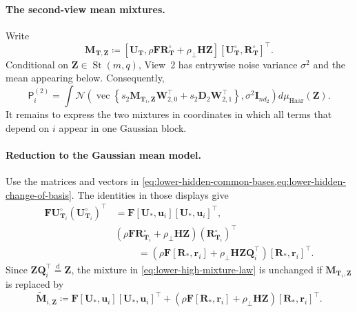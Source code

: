 \documentclass[11pt]{article}
\newcommand{\trans}{\top}
\begin{document}
\paragraph{The second-view mean mixtures.}
Write
\[
  \bm M_{\bm T,\bm Z}
  \coloneqq
  \left[
    \bm U_{\bm T},
    \rho\bm F\bm R_{\bm T}^{\circ}
      +\rho_\perp\bm H\bm Z
  \right]
  [\bm U_{\bm T}^{\circ},\bm R_{\bm T}^{\circ}]^\trans.
\]
Conditional on $\bm Z\in\operatorname{St}(m,q)$, View~2 has entrywise noise
variance $\sigma^2$ and the mean appearing below.  Consequently,
\begin{equation}
  \mathsf P_i^{(2)}
  =
  \int
  \mathcal N\left(
    \operatorname{vec}\left\{
      s_2\bm M_{\bm T_i,\bm Z}\bm W_{2,0}^\trans
      +
      s_2\bm D_2\bm W_{2,1}^\trans
    \right\},
    \sigma^2\bm I_{nd_2}
  \right)
  d\mu_{\mathrm{Haar}}(\bm Z).
\label{eq:lower-high-mixture-law}
\end{equation}
It remains to express the two mixtures in coordinates in which all terms
that depend on $i$ appear in one Gaussian block.

\paragraph{Reduction to the Gaussian mean model.}
Use the matrices and vectors in
\cref{eq:lower-hidden-common-bases,eq:lower-hidden-change-of-basis}.  The
identities in those displays give
\begin{equation}
\begin{aligned}
  \bm F\bm U_{\bm T_i}^{\circ}
  (\bm U_{\bm T_i}^{\circ})^\trans
  &=
  \bm F[\bm U_*,\bm u_i][\bm U_*,\bm u_i]^\trans,\\
  &(\rho\bm F\bm R_{\bm T_i}^{\circ}+\rho_\perp\bm H\bm Z)
  (\bm R_{\bm T_i}^{\circ})^\trans\\
  &\hspace{1cm}=
  (\rho\bm F[\bm R_*,\bm r_i]
    +\rho_\perp\bm H\bm Z\bm Q_i^\trans)
  [\bm R_*,\bm r_i]^\trans.
\end{aligned}
\label{eq:lower-high-basis-change}
\end{equation}
Since $\bm Z\bm Q_i^\trans\overset{\mathrm d}{=}\bm Z$, the mixture in
\cref{eq:lower-high-mixture-law} is unchanged if
$\bm M_{\bm T_i,\bm Z}$ is replaced by
\begin{equation}
  \widetilde{\bm M}_{i,\bm Z}
  \coloneqq
  \bm F[\bm U_*,\bm u_i][\bm U_*,\bm u_i]^\trans
  +
  (\rho\bm F[\bm R_*,\bm r_i]+\rho_\perp\bm H\bm Z)
  [\bm R_*,\bm r_i]^\trans.
\label{eq:lower-high-aligned-mean}
\end{equation}
\end{document}
